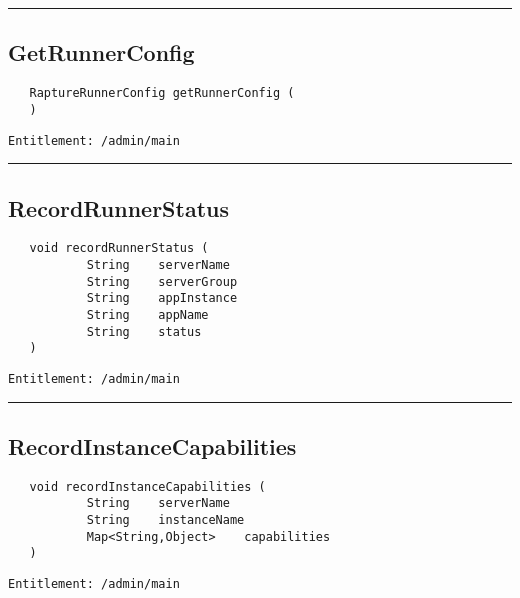 \rule{12cm}{2pt}
\subsection{GetRunnerConfig}
\label{Api:GetRunnerConfig}
\begin{Verbatim}
   RaptureRunnerConfig getRunnerConfig (
   )
\end{Verbatim}
\begin{Verbatim}[formatcom=\color{Maroon}]
  Entitlement: /admin/main
\end{Verbatim}



\rule{12cm}{2pt}
\subsection{RecordRunnerStatus}
\label{Api:RecordRunnerStatus}
\begin{Verbatim}
   void recordRunnerStatus (
           String    serverName
           String    serverGroup
           String    appInstance
           String    appName
           String    status
   )
\end{Verbatim}
\begin{Verbatim}[formatcom=\color{Maroon}]
  Entitlement: /admin/main
\end{Verbatim}



\rule{12cm}{2pt}
\subsection{RecordInstanceCapabilities}
\label{Api:RecordInstanceCapabilities}
\begin{Verbatim}
   void recordInstanceCapabilities (
           String    serverName
           String    instanceName
           Map<String,Object>    capabilities
   )
\end{Verbatim}
\begin{Verbatim}[formatcom=\color{Maroon}]
  Entitlement: /admin/main
\end{Verbatim}



